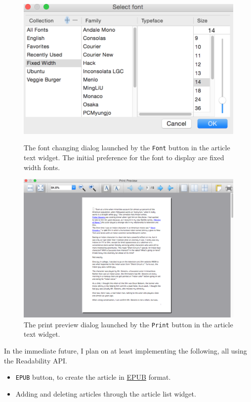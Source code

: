 \documentclass[]{article}
\begin{document}
\begin{figure}[!ht]
  \begin{minipage}[!ht]{0.53\linewidth}
   \includegraphics[width=\linewidth]{images/gui2_screenshot_fontdialog.png}
    \caption{The font changing dialog launched by the \texttt{Font} button in the article text widget. The initial preference for the font to display are fixed width fonts.} \label{fig:gui2_screenshot_fontdialog}
  \end{minipage} \hfill
  \begin{minipage}[!ht]{0.45\linewidth}
   \includegraphics[width=\linewidth]{images/gui2_screenshot_printpreviewdialog.png}
    \caption{The print preview dialog launched by the \texttt{Print} button in the article text widget.} \label{fig:gui2_screenshot_printpreviewdialog}
  \end{minipage}
\end{figure}
In the immediate future, I plan on at least implementing the following, all using the Readability API.
\begin{itemize}
  \item {\verb|EPUB|} button, to create the article in \href{https://en.wikipedia.org/wiki/EPUB}{EPUB} format.
  
  \item Adding and deleting articles through the article list widget.
\end{itemize}
\end{document}
